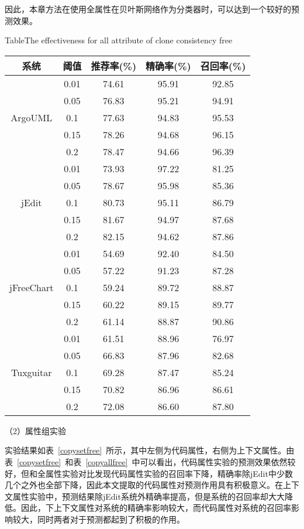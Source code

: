 因此，本章方法在使用全属性在贝叶斯网络作为分类器时，可以达到一个较好的预测效果。

\begin{table}[htbp]
{Table$\!$}{The effectiveness for all attribute of clone consistency free}
\vspace{0.5em}
\centering
\wuhao
\begin{tabular}{ccccc}
\toprule[1.5pt]
{系统}&{阈值}&{推荐率(\%)}&{精确率(\%)}&{召回率(\%)}\\
\midrule[1pt]
\multirow{5}{*}{ArgoUML}
&0.01&	74.61&	95.91&	92.85\\
&0.05&	76.83&	95.21&	94.91\\
&0.1&	77.63&	94.83&	95.53\\
&0.15&  78.26&	94.68&	96.15\\
&0.2&	78.47&	94.66&	96.39\\
\hline
\multirow{5}{*}{jEdit}
&0.01&	73.93&	97.22&	81.25\\
&0.05&	78.67&	95.98&	85.36	\\
&0.1&	80.73&	95.11&	86.79	\\
&0.15&	81.67&	94.97&	87.68	\\
&0.2&	82.15&	94.62&	87.86	\\
\hline
\multirow{5}{*}{jFreeChart}
&0.01&	54.69&	92.40&	84.50\\
&0.05&	57.22&	91.23&	87.28\\
&0.1&	59.24&	89.72&	88.87\\
&0.15&	60.22&	89.15&	89.77\\
&0.2&	61.14&	88.87&	90.86\\
\hline
\multirow{5}{*}{Tuxguitar}
&0.01&	61.51&	88.96&	76.97\\
&0.05&	66.83&	87.96&	82.68\\
&0.1&	69.28&	87.47&	85.24\\
&0.15&	70.82&	86.96&	86.61\\
&0.2&	72.08&	86.60&	87.80\\
\bottomrule[1.5pt]
\end{tabular}
\end{table}

（2）属性组实验

实验结果如表~\ref{copysetfree}~所示，其中左侧为代码属性，右侧为上下文属性。由表~\ref{copysetfree}~和表~\ref{copyallfree}~中可以看出，代码属性实验的预测效果依然较好，但和全属性实验对比发现代码属性实验的召回率下降，精确率除jEdit中少数几个之外也全部下降，因此本文提取的代码属性对预测作用具有积极意义。在上下文属性实验中，预测结果除jEdit系统外精确率提高，但是系统的召回率却大大降低。因此，下上下文属性对系统的精确率影响较大，而代码属性对系统的召回率影响较大，同时两者对于预测都起到了积极的作用。

